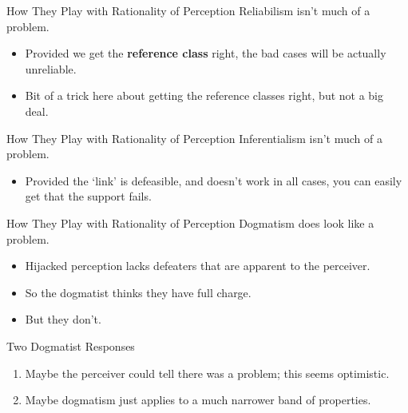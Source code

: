 \documentclass[
  17pt,
  letterpaper,
  ignorenonframetext,
  aspectratio=169,
  handout,
  xcolor={dvipsnames}]{beamer}
\providecommand{\tightlist}{%
  \setlength{\itemsep}{0pt}\setlength{\parskip}{0pt}}\usepackage{longtable,booktabs,array}
\begin{document}
\begin{frame}{How They Play with Rationality of Perception}
\protect\hypertarget{how-they-play-with-rationality-of-perception-2}{}
Reliabilism isn't much of a problem.

\begin{itemize}[<+->]
\tightlist
\item
  Provided we get the \textbf{reference class} right, the bad cases will
  be actually unreliable.
\item
  Bit of a trick here about getting the reference classes right, but not
  a big deal.
\end{itemize}
\end{frame}

\begin{frame}{How They Play with Rationality of Perception}
\protect\hypertarget{how-they-play-with-rationality-of-perception-3}{}
Inferentialism isn't much of a problem.

\begin{itemize}[<+->]
\tightlist
\item
  Provided the `link' is defeasible, and doesn't work in all cases, you
  can easily get that the support fails.
\end{itemize}
\end{frame}

\begin{frame}{How They Play with Rationality of Perception}
\protect\hypertarget{how-they-play-with-rationality-of-perception-4}{}
Dogmatism does look like a problem.

\begin{itemize}[<+->]
\tightlist
\item
  Hijacked perception lacks defeaters that are apparent to the
  perceiver.
\item
  So the dogmatist thinks they have full charge.
\item
  But they don't.
\end{itemize}
\end{frame}

\begin{frame}{Two Dogmatist Responses}
\protect\hypertarget{two-dogmatist-responses}{}
\begin{enumerate}[<+->]
\tightlist
\item
  Maybe the perceiver could tell there was a problem; this seems
  optimistic.
\item
  Maybe dogmatism just applies to a much narrower band of properties.
\end{enumerate}
\end{frame}
\end{document}
